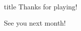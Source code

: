 \documentclass[11pt]{beamer}
\begin{document}
\section*{\ }
\subsection*{\ }
\begingroup{}
\begin{frame}
\vfill{}
\centering{}
\begin{beamercolorbox}[sep=8pt,center,shadow=true,rounded=true]{title}
Thanks for playing!\par%
See you next month!
\end{beamercolorbox}
\vfill{}
\end{frame}
\endgroup{}
\end{document}
